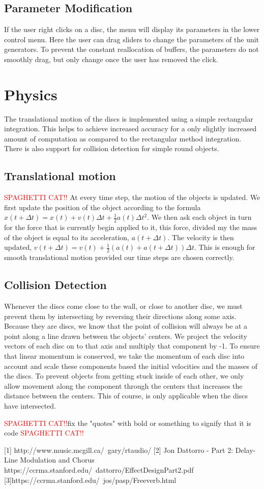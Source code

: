 \documentclass[pdftext,twoside,10pt]{article}
\newcommand{\spag}{\textcolor{red}{SPAGHETTI CAT!!}}
\begin{document}
\subsection{Parameter Modification}
If the user right clicks on a disc, the menu will display its parameters in the lower control menu. Here the user can drag sliders to change the parameters of the unit generators. To prevent the constant reallocation of buffers, the parameters do not smoothly drag, but only change once the user has removed the click.

\section{Physics}
The translational motion of the discs is implemented using a simple rectangular integration. This helps to achieve increased accuracy for a only slightly increased amount of computation as compared to the rectangular method integration. There is also support for collision detection for simple round objects.

\subsection{Translational motion}\spag
At every time step, the motion of the objects is updated. We first update the position of the object according to the formula $x(t + \Delta t) = x(t) + v(t)\Delta t + \frac{1}{2}a(t)\Delta t^2$. We then ask each object in turn for the force that is currently begin applied to it, this force, divided my the mass of the object is equal to its acceleration, $a(t+\Delta t)$. The velocity is then updated, $v(t + \Delta t) = v(t) + \frac{1}{2}(a(t) + a(t + \Delta t))\Delta t$. This is enough for smooth translational motion provided our time steps are chosen correctly.

\subsection{Collision Detection}
Whenever the discs come close to the wall, or close to another disc, we must prevent them by intersecting by reversing their directions along some axis. Because they are discs, we know that the point of collision will always be at a point along a line drawn between the objects' centers. We project the velocity vectors of each disc on to that axis and multiply that component by -1. To ensure that linear momentum is conserved, we take the momentum of each disc into account and scale these components based the initial velocities and the masses of the discs. To prevent objects from getting stuck inside of each other, we only allow movement along the component through the centers that increases the distance between the centers. This of course, is only applicable when the discs have intersected.

\spag fix the "quotes" with bold or something to signify that it is code \spag

[1] http://www.music.mcgill.ca/~gary/rtaudio/
[2] Jon Dattorro - Part 2: Delay-Line Modulation and Chorus  
https://ccrma.stanford.edu/~dattorro/EffectDesignPart2.pdf 
[3]https://ccrma.stanford.edu/~jos/pasp/Freeverb.html 
\end{document}
